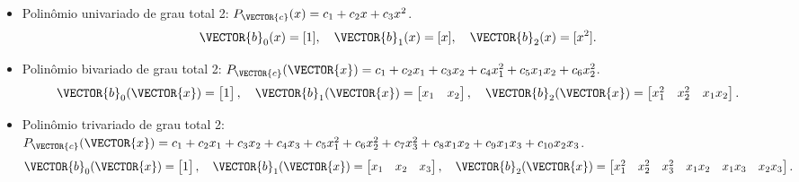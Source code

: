 \begin{example}\label{ex:theo:reglogrnr1poly:multinomio}~\\
\begin{itemize}
\item Polinômio univariado de grau total 2: 
$P_{\VECTOR{c}}(x)=c_1 + c_2 x + c_3 x^2$.
\begin{equation}
\VECTOR{b}_0(x)=[1],
\quad 
\VECTOR{b}_1(x)=[x],
\quad 
\VECTOR{b}_2(x)=[x^2].
\end{equation}
\item Polinômio bivariado de grau total 2: 
$P_{\VECTOR{c}}(\VECTOR{x})=c_1 + c_2 x_1 + c_3 x_2 + c_4 x_1^2 + c_5 x_1 x_2+ c_6 x_2^2$.
\begin{equation}
\VECTOR{b}_0(\VECTOR{x})=
\begin{bmatrix}
1
\end{bmatrix},
\quad 
\VECTOR{b}_1(\VECTOR{x})=
\begin{bmatrix}
x_1 & x_2
\end{bmatrix},
\quad 
\VECTOR{b}_2(\VECTOR{x})=
\begin{bmatrix}
x_1^2 & x_2^2 & x_1x_2
\end{bmatrix}.
\end{equation}
\item Polinômio trivariado de grau total 2: 
$P_{\VECTOR{c}}(\VECTOR{x})=c_1 + 
c_2 x_1 + c_3 x_2 + c_4 x_3 + 
c_5 x_1^2 + c_6 x_2^2 + c_7 x_3^2 + c_8 x_1 x_2+ c_9 x_1 x_3 + c_{10} x_2 x_3$.
\begin{equation}\label{eq:b0b1b2}
\VECTOR{b}_0(\VECTOR{x})=
\begin{bmatrix}
1
\end{bmatrix},
\quad 
\VECTOR{b}_1(\VECTOR{x})=
\begin{bmatrix}
x_1 & x_2 & x_3
\end{bmatrix},
\quad 
\VECTOR{b}_2(\VECTOR{x})=
\begin{bmatrix}
x_1^2 & x_2^2 & x_3^2 & x_1x_2 & x_1x_3 & x_2x_3
\end{bmatrix}.
\end{equation}
\end{itemize}
\end{example}


